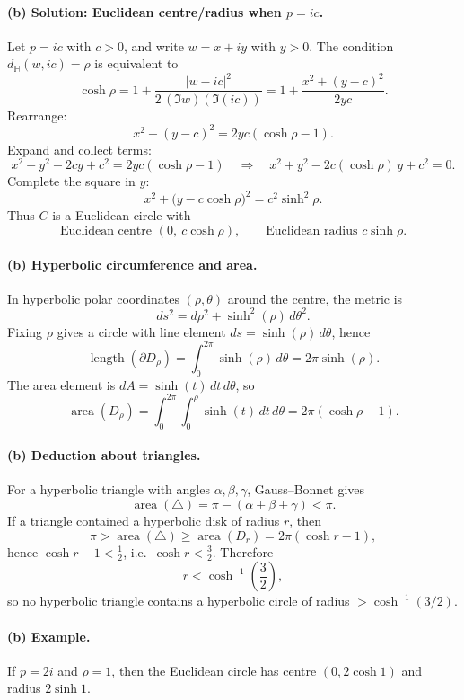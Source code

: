 \documentclass[12pt,a4paper]{article}
\newcommand{\hyp}{\mathbb{H}}
\theoremstyle{plain}
\theoremstyle{definition}      %
\begin{document}
	\paragraph{(b) Solution: Euclidean centre/radius when $p=ic$.}
	Let $p=ic$ with $c>0$, and write $w=x+iy$ with $y>0$.
	The condition $d_{\hyp}(w,ic)=\rho$ is equivalent to
	\[
	\cosh\rho
	=1+\frac{|w-ic|^2}{2\,(\Im w)(\Im(ic))}
	=1+\frac{x^2+(y-c)^2}{2yc}.
	\]
	Rearrange:
	\[
	x^2+(y-c)^2 = 2yc(\cosh\rho-1).
	\]
	Expand and collect terms:
	\[
	x^2+y^2-2cy+c^2 = 2yc(\cosh\rho-1)
	\quad\Longrightarrow\quad
	x^2+y^2-2c(\cosh\rho)\,y+c^2=0.
	\]
	Complete the square in $y$:
	\[
	x^2+\bigl(y-c\cosh\rho\bigr)^2
	= c^2\sinh^2\rho.
	\]
	Thus $C$ is a Euclidean circle with
	\[
	\text{Euclidean centre }(0,\ c\cosh\rho),
	\qquad
	\text{Euclidean radius }c\sinh\rho.
	\]
	
	\paragraph{(b) Hyperbolic circumference and area.}
	In hyperbolic polar coordinates $(\rho,\theta)$ around the centre, the metric is
	\[
	ds^2=d\rho^2+\sinh^2(\rho)\,d\theta^2.
	\]
	Fixing $\rho$ gives a circle with line element $ds=\sinh(\rho)\,d\theta$, hence
	\[
	\operatorname{length}(\partial D_\rho)
	=\int_0^{2\pi}\sinh(\rho)\,d\theta
	=2\pi\sinh(\rho).
	\]
	The area element is $dA=\sinh(t)\,dt\,d\theta$, so
	\[
	\operatorname{area}(D_\rho)
	=\int_0^{2\pi}\int_0^\rho \sinh(t)\,dt\,d\theta
	=2\pi(\cosh\rho-1).
	\]
	
	\paragraph{(b) Deduction about triangles.}
	For a hyperbolic triangle with angles $\alpha,\beta,\gamma$, Gauss--Bonnet gives
	\[
	\operatorname{area}(\triangle)=\pi-(\alpha+\beta+\gamma)<\pi.
	\]
	If a triangle contained a hyperbolic disk of radius $r$, then
	\[
	\pi>\operatorname{area}(\triangle)\ge \operatorname{area}(D_r)=2\pi(\cosh r-1),
	\]
	hence $\cosh r-1<\tfrac12$, i.e.\ $\cosh r<\tfrac32$.
	Therefore
	\[
	r<\cosh^{-1}\!\left(\frac32\right),
	\]
	so no hyperbolic triangle contains a hyperbolic circle of radius
	$>\cosh^{-1}(3/2)$.
	
	\paragraph{(b) Example.}
	If $p=2i$ and $\rho=1$, then the Euclidean circle has centre
	$(0,2\cosh 1)$ and radius $2\sinh 1$.
	
\end{document}
